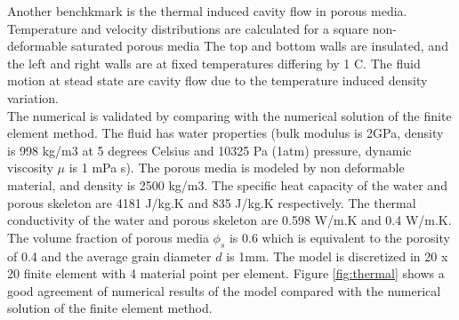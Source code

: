 \documentclass[preprint,12pt]{elsarticle}
\begin{document}
%
%
Another benchkmark is the thermal induced cavity flow in porous media. Temperature and velocity distributions are calculated for a square non-deformable saturated porous media The top and bottom walls are insulated, and the left and right walls are at fixed temperatures differing by 1 C. The fluid motion at stead state are cavity flow due to the temperature induced density variation. \\
The numerical is validated by comparing with the numerical solution of the finite element method. The fluid has water properties (bulk modulus is 2GPa, density is 998 kg/m3 at 5 degrees Celsius and 10325 Pa (1atm) pressure, dynamic viscosity $\mu$ is 1 mPa s). The porous media is modeled by non deformable material, and density is 2500 kg/m3. The specific heat capacity of the water and porous skeleton are 4181 J/kg.K and 835 J/kg.K respectively. The thermal conductivity of the water and porous skeleton are 0.598 W/m.K and 0.4 W/m.K. The volume fraction of porous media $\phi_s$ is 0.6 which is equivalent to the porosity of 0.4 and the average grain diameter $d$ is 1mm. The model is discretized in 20 x 20 finite element with 4 material point per element. Figure \ref{fig:thermal} shows a good agreement of numerical results of the model compared with the numerical solution of the finite element method. \\
\end{document}
